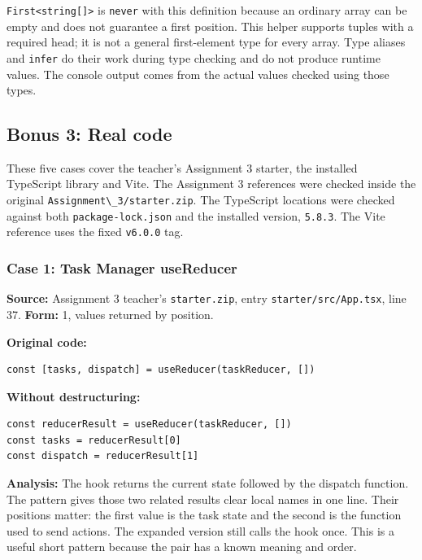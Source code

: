 \documentclass[
  11pt,
]{article}
\newcommand{\passthrough}[1]{#1}
\begin{document}
\passthrough{\lstinline!First<string[]>!} is
\passthrough{\lstinline!never!} with this definition because an ordinary
array can be empty and does not guarantee a first position. This helper
supports tuples with a required head; it is not a general first-element
type for every array. Type aliases and \passthrough{\lstinline!infer!}
do their work during type checking and do not produce runtime values.
The console output comes from the actual values checked using those
types.

\subsection{Bonus 3: Real code}\label{bonus-3-real-code}

These five cases cover the teacher's Assignment 3 starter, the installed
TypeScript library and Vite. The Assignment 3 references were checked
inside the original \passthrough{\lstinline!Assignment\_3/starter.zip!}.
The TypeScript locations were checked against both
\passthrough{\lstinline!package-lock.json!} and the installed version,
\passthrough{\lstinline!5.8.3!}. The Vite reference uses the fixed
\passthrough{\lstinline!v6.0.0!} tag.

\subsubsection{Case 1: Task Manager
useReducer}\label{case-1-task-manager-usereducer}

\textbf{Source:} Assignment 3 teacher's
\passthrough{\lstinline!starter.zip!}, entry
\passthrough{\lstinline!starter/src/App.tsx!}, line 37. \textbf{Form:}
1, values returned by position.

\textbf{Original code:}

\begin{lstlisting}
const [tasks, dispatch] = useReducer(taskReducer, [])
\end{lstlisting}

\textbf{Without destructuring:}

\begin{lstlisting}
const reducerResult = useReducer(taskReducer, [])
const tasks = reducerResult[0]
const dispatch = reducerResult[1]
\end{lstlisting}

\textbf{Analysis:} The hook returns the current state followed by the
dispatch function. The pattern gives those two related results clear
local names in one line. Their positions matter: the first value is the
task state and the second is the function used to send actions. The
expanded version still calls the hook once. This is a useful short
pattern because the pair has a known meaning and order.
\end{document}
